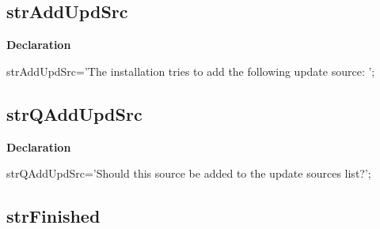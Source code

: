 \documentclass{report}
\newif\ifpdf
\begin{document}
\subsection*{strAddUpdSrc}
\fi
\label{trstrings-strAddUpdSrc}
\begin{list}{}{
\setlength{\itemindent}{0cm}
\setlength{\listparindent}{0cm}
\setlength{\leftmargin}{\evensidemargin}
\addtolength{\leftmargin}{\tmplength}
\settowidth{\labelsep}{X}
\addtolength{\leftmargin}{\labelsep}
\setlength{\labelwidth}{\tmplength}
}
\item[\textbf{Declaration}\hfill]
\ifpdf
\begin{flushleft}
\fi
\begin{ttfamily}
strAddUpdSrc='The installation tries to add the following update source: ';\end{ttfamily}

\ifpdf
\end{flushleft}
\fi

\end{list}
\ifpdf
\subsection*{\large{\textbf{strQAddUpdSrc}}\normalsize\hspace{1ex}\hrulefill}
\else
\subsection*{strQAddUpdSrc}
\fi
\label{trstrings-strQAddUpdSrc}
\begin{list}{}{
\setlength{\itemindent}{0cm}
\setlength{\listparindent}{0cm}
\setlength{\leftmargin}{\evensidemargin}
\addtolength{\leftmargin}{\tmplength}
\settowidth{\labelsep}{X}
\addtolength{\leftmargin}{\labelsep}
\setlength{\labelwidth}{\tmplength}
}
\item[\textbf{Declaration}\hfill]
\ifpdf
\begin{flushleft}
\fi
\begin{ttfamily}
strQAddUpdSrc='Should this source be added to the update sources list?';\end{ttfamily}

\ifpdf
\end{flushleft}
\fi

\end{list}
\ifpdf
\subsection*{\large{\textbf{strFinished}}\normalsize\hspace{1ex}\hrulefill}
\else
\end{document}
